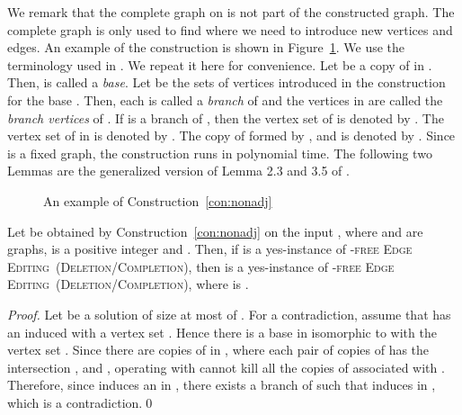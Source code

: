 \documentclass[envcountsame,envcountsect,10pt,oribibl]{llncs}
\newcommand{\pname}[1]{\textnormal{\textsc{#1}}}
\newcommand{\HEE}{\pname{-free Edge Editing}}
\newcommand{\HDEE}{\pname{-free Edge Editing}}
\begin{document}
We remark that the complete graph  on  is not part of the constructed graph.
The complete graph is only used to find where we need to introduce new vertices and edges.
An example of the construction is shown in Figure~\ref{fig:cons}.
We use the terminology used in \cite{DBLP:conf/cocoa/AravindSS15}. We repeat it here for convenience.
Let  be a copy of  in . Then,  is called a \emph{base}.
Let  be the  sets of vertices introduced in the construction for the base .
Then, each  is called a \emph{branch} of  and the vertices in  are called 
the \emph{branch vertices} of . If  is a branch of , then
the vertex set of  is denoted by .
The vertex set of  in  is denoted by . The copy of  formed by , 
and  is denoted by . Since  is a fixed graph, the construction runs in polynomial time. 
The following two Lemmas are the generalized version of Lemma 2.3 and 3.5 of \cite{DBLP:conf/cocoa/AravindSS15}.

\begin{figure}[h]
  \centering
  \qquad
  \qquad
  \caption{An example of Construction~\ref{con:nonadj}}
  \label{fig:cons}
\end{figure}

\begin{lemma}
  \label{lem:con:nonadj-backward}
  Let  be obtained by Construction~\ref{con:nonadj} on 
  the input , where  and  are graphs,  is a positive integer and .
  Then, if  is a yes-instance of \HEE~(\textsc{Deletion}/\textsc{Completion}), 
  then  is a yes-instance of \HDEE~(\textsc{Deletion}/\textsc{Completion}), 
  where  is .
\end{lemma}
\begin{proof}
  Let  be a solution of size at most  of . For a contradiction, assume that 
  has an induced  with a vertex set . Hence there is a base  in  isomorphic to
   with the vertex set . Since there are  copies of  in , where each pair
  of copies of  has the intersection , and , operating with  cannot kill all the copies of 
   associated with . Therefore,
  since  induces an  in , there exists a branch  of  such that 
  induces  in , which is a contradiction.\qed
\end{proof}
\end{document}
